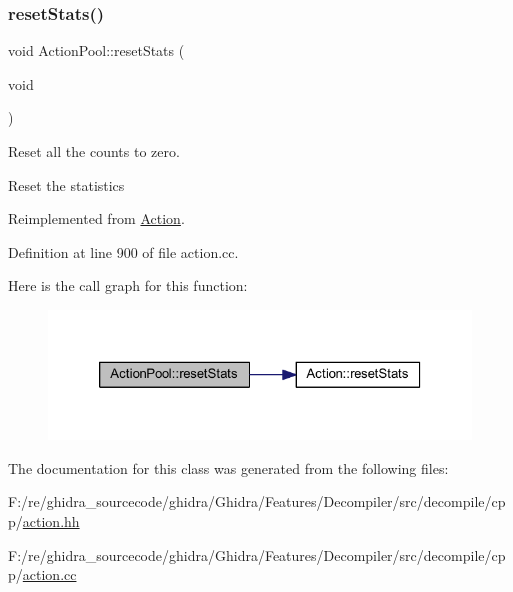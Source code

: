 \subsubsection{\texorpdfstring{resetStats()}{resetStats()}}
{\footnotesize\ttfamily void Action\+Pool\+::reset\+Stats (\begin{DoxyParamCaption}\item[{void}]{ }\end{DoxyParamCaption})\hspace{0.3cm}{\ttfamily [virtual]}}



Reset all the counts to zero. 

Reset the statistics 

Reimplemented from \mbox{\hyperlink{class_action_a8ac616ae7f497202746a92c95e32821d}{Action}}.



Definition at line 900 of file action.\+cc.

Here is the call graph for this function\+:
\nopagebreak
\begin{figure}[H]
\begin{center}
\leavevmode
\includegraphics[width=326pt]{class_action_pool_aef3e6dfc90703230f5f4e3fcdc626984_cgraph}
\end{center}
\end{figure}


The documentation for this class was generated from the following files\+:\begin{DoxyCompactItemize}
\item 
F\+:/re/ghidra\+\_\+sourcecode/ghidra/\+Ghidra/\+Features/\+Decompiler/src/decompile/cpp/\mbox{\hyperlink{action_8hh}{action.\+hh}}\item 
F\+:/re/ghidra\+\_\+sourcecode/ghidra/\+Ghidra/\+Features/\+Decompiler/src/decompile/cpp/\mbox{\hyperlink{action_8cc}{action.\+cc}}\end{DoxyCompactItemize}
